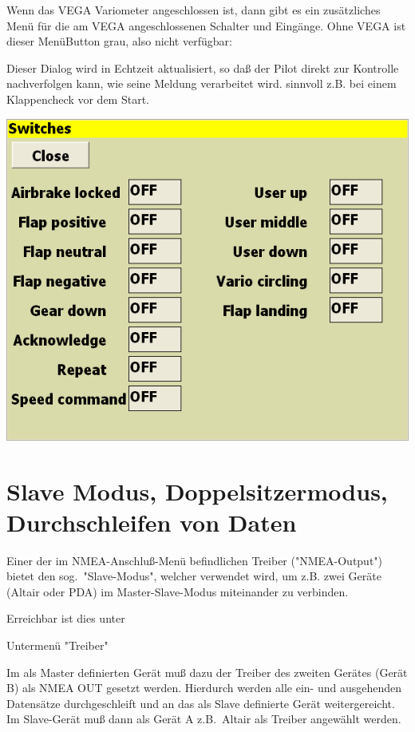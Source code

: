 Wenn das VEGA Variometer angeschlossen ist, dann gibt es ein zusätzliches Menü für die am VEGA angeschlossenen Schalter und Eingänge. Ohne VEGA ist dieser MenüButton grau, also nicht verfügbar:
\begin{quote}
\blink{}\blink{}\blink{}
\end{quote}

Dieser Dialog wird in Echtzeit aktualisiert, so daß der Pilot direkt zur Kontrolle nachverfolgen kann, wie seine Meldung verarbeitet wird. sinnvoll z.B. bei einem Klappencheck vor dem Start.

\begin{center}
\includegraphics[angle=0,width=0.7\linewidth,keepaspectratio='true']{figures/dialog-switches.png}
\end{center}

\section{Slave Modus, Doppelsitzermodus,  Durchschleifen von Daten}

Einer der im NMEA-Anschluß-Menü befindlichen Treiber ("NMEA-Output") bietet den sog.\   "Slave-Modus", welcher verwendet wird,  um z.B. zwei Geräte  (\textsf{Altair} oder \textsf{PDA})  im Master-Slave-Modus miteinander zu verbinden. \halt

Erreichbar ist dies unter
\begin{quote}
\blink{}\blink{}\blink{}
\end{quote}
Untermenü "Treiber"

Im als Master definierten Gerät muß dazu der Treiber des zweiten Gerätes (Gerät B) als NMEA OUT gesetzt werden.
Hierdurch werden alle ein- und ausgehenden Datensätze  durchgeschleift und an das als Slave definierte Gerät weitergereicht.
Im Slave-Gerät muß dann als Gerät A z.B.\ \textsf{Altair} als Treiber angewählt werden.

